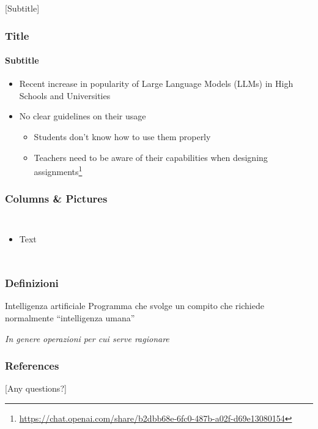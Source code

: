 [Subtitle]

\begin{contentframe}
    \frametitle{Title}
    \framesubtitle{Subtitle}

    \begin{itemize}
        \item Recent increase in popularity of Large Language Models (LLMs) in High Schools and Universities

        \bigskip
        \item No clear guidelines on their usage
        \begin{itemize}
            \item Students don't know how to use them properly
            \item Teachers need to be aware of their capabilities when designing assignments\footnote{\url{https://chat.openai.com/share/b2dbb68e-6fc0-487b-a02f-d69e13080154}}\cite{geng2023can, ouh2023chatgpt}
        \end{itemize}
    \end{itemize}
\end{contentframe}

\begin{contentframe}
    \frametitle{Columns \& Pictures}

    \begin{columns}
        \begin{itemize}
            \item Text
        \end{itemize}

        \centering
    \end{columns}
\end{contentframe}

\begin{contentframe}
    \frametitle{Definizioni}

    \begin{block}{Intelligenza artificiale}
        Programma che svolge un compito che richiede normalmente ``intelligenza umana''

        \small\textit{In genere operazioni per cui serve ragionare}
    \end{block}
\end{contentframe}

\begin{bibframe}
    \frametitle{References}
\end{bibframe}

[Any questions?]